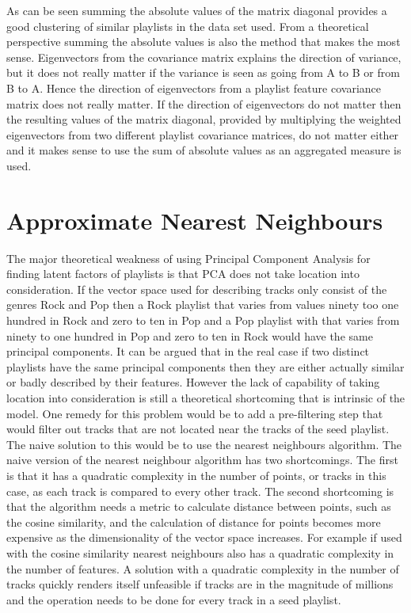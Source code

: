 \documentclass[a4paper,11pt]{kth-mag}
\begin{document}
As can be seen summing the absolute values of the matrix diagonal provides a good clustering of similar playlists in the data set used. From a theoretical perspective summing the absolute values is also the method that makes the most sense. Eigenvectors from the covariance matrix explains the direction of variance, but it does not really matter if the variance is seen as going from A to B or from B to A. Hence the direction of eigenvectors from a playlist feature covariance matrix does not really matter. If the direction of eigenvectors do not matter then the resulting values of the matrix diagonal, provided by multiplying the weighted eigenvectors from two different playlist covariance matrices, do not matter either and it makes sense to use the sum of absolute values as an aggregated measure is used.

\section{Approximate Nearest Neighbours}
The major theoretical weakness of using Principal Component Analysis for finding latent factors of playlists is that PCA does not take location into consideration. If the vector space used for describing tracks only consist of the genres Rock and Pop then a Rock playlist that varies from values ninety too one hundred in Rock and zero to ten in Pop and a Pop playlist with that varies from ninety to one hundred in Pop and zero to ten in Rock would have the same principal components. It can be argued that in the real case if two distinct playlists have the same principal components then they are either actually similar or badly described by their features. However the lack of capability of taking location into consideration is still a theoretical shortcoming that is intrinsic of the model. One remedy for this problem would be to add a pre-filtering step that would filter out tracks that are not located near the tracks of the seed playlist. The naive solution to this would be to use the nearest neighbours algorithm. The naive version of the nearest neighbour algorithm has two shortcomings. The first is that it has a quadratic complexity in the number of points, or tracks in this case, as each track is compared to every other track. The second shortcoming is that the algorithm needs a metric to calculate distance between points, such as the cosine similarity, and the calculation of distance for points becomes more expensive as the dimensionality of the vector space increases. For example if used with the cosine similarity nearest neighbours also has a quadratic complexity in the number of features. A solution with a quadratic complexity in the number of tracks quickly renders itself unfeasible if tracks are in the magnitude of millions and the operation needs to be done for every track in a seed playlist. 
\end{document}
